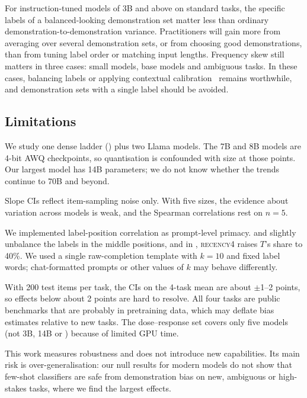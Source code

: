  For instruction-tuned models of 3B and above on standard tasks, the specific labels of a balanced-looking demonstration set matter less than ordinary demonstration-to-demonstration variance. Practitioners will gain more from averaging over several demonstration sets, or from choosing good demonstrations, than from tuning label order or matching input lengths. Frequency skew still matters in three cases: small models, base models and ambiguous tasks. In these cases, balancing labels or applying contextual calibration~\citep{zhao2021calibrate,fei2023mitigating} remains worthwhile, and demonstration sets with a single label should be avoided.

\subsection{Limitations}
\label{sec:limitations}

 We study one dense ladder (\qwen) plus two Llama models. The 7B and 8B models are 4-bit AWQ checkpoints, so quantisation is confounded with size at those points. Our largest model has 14B parameters; we do not know whether the trends continue to 70B and beyond.

 Slope CIs reflect item-sampling noise only. With five sizes, the evidence about variation across models is weak, and the Spearman correlations rest on $n=5$.

 We implemented label-position correlation as prompt-level primacy. \recency and \primacy slightly unbalance the labels in the middle positions, and in \agnews, \textsc{recency4} raises $T$'s share to 40\%. We used a single raw-completion template with $k=10$ and fixed label words; chat-formatted prompts or other values of $k$ may behave differently.

 With 200 test items per task, the CIs on the 4-task mean are about $\pm$1--2 points, so effects below about 2 points are hard to resolve. All four tasks are public benchmarks that are probably in pretraining data, which may deflate bias estimates relative to new tasks. The dose--response set covers only five models (not 3B, 14B or \llamaeight) because of limited GPU time.

 This work measures robustness and does not introduce new capabilities. Its main risk is over-generalisation: our null results for modern models do not show that few-shot classifiers are safe from demonstration bias on new, ambiguous or high-stakes tasks, where we find the largest effects.
